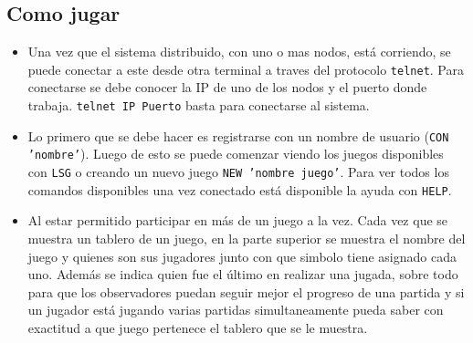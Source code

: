 \documentclass[a4paper]{article}
\newcommand{\blacktr}[0]{\item[$\blacktriangleright$]}
\begin{document}
\subsection*{Como jugar}
\begin{itemize}
  \blacktr Una vez que el sistema distribuido, con uno o mas nodos, está corriendo, se puede conectar a este desde otra terminal a traves del protocolo \texttt{telnet}. Para conectarse se debe conocer la IP de uno de los nodos y el puerto donde trabaja. \texttt{telnet IP Puerto} basta para conectarse al sistema.
  \blacktr Lo primero que se debe hacer es registrarse con un nombre de usuario (\texttt{CON 'nombre'}). Luego de esto se puede comenzar viendo los juegos disponibles con \texttt{LSG} o creando un nuevo juego \texttt{NEW 'nombre juego'}. Para ver todos los comandos disponibles una vez conectado está disponible la ayuda con \texttt{HELP}.
  \blacktr Al estar permitido participar en más de un juego a la vez. Cada vez que se muestra un tablero de un juego, en la parte superior se muestra el nombre del juego y quienes son sus jugadores junto con que simbolo tiene asignado cada uno. Además se indica quien fue el último en realizar una jugada, sobre todo para que los observadores puedan seguir mejor el progreso de una partida y si un jugador está jugando varias partidas simultaneamente pueda saber con exactitud a que juego pertenece el tablero que se le muestra.
\end{itemize}
\end{document}
